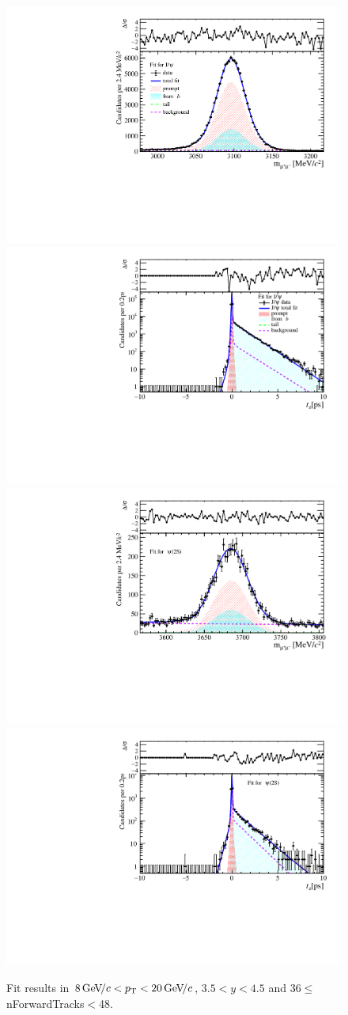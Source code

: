 \begin{figure}[H]
\begin{center}
\includegraphics[width=0.47\linewidth]{pdf/Jpsi/drawmassF/n4y3pt5.pdf}
\includegraphics[width=0.47\linewidth]{pdf/Jpsi/2DFitF/n4y3pt5.pdf}
\vspace*{-0.5cm}
\includegraphics[width=0.47\linewidth]{pdf/Psi2S/drawmassF/n4y3pt5.pdf}
\includegraphics[width=0.47\linewidth]{pdf/Psi2S/2DFitF/n4y3pt5.pdf}
\vspace*{-0.5cm}
\end{center}
\caption{Fit results in $8\text{\,Ge\kern -0.1em V\!/}c<p_{\mathrm{T}}<20\text{\,Ge\kern -0.1em V\!/}c$, $3.5<y<4.5$ and 36$\leq$nForwardTracks$<$48.}
\label{Fitn4y3pt5}
\end{figure}
